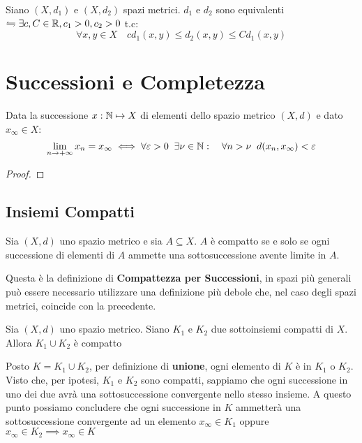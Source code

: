 Siano $(X,d_1)$ e $(X,d_2)$ spazi metrici. $d_1$ e $d_2$ sono equivalenti $\leftrightharpoons \exists c,C\in\mathbb{R}, c_1>0, c_2>0$ t.c:
$$ \forall x,y \in X\quad cd_1(x,y)\le d_2(x,y)\le Cd_1(x,y) $$


\section{Successioni e Completezza}
\begin{definition}
\end{definition}
\begin{definition}
\end{definition}
\begin{definition}
\end{definition}
\begin{proposition}
	\label{prop:succ_conv_lim}
	Data la successione $x: \mathbb{N} \mapsto X$ di elementi dello spazio metrico $(X,d)$ e dato $x_\infty\in X$:
	$$\lim\limits_{n\rightarrow+\infty}x_n=x_\infty\iff\forall\varepsilon > 0\;\;\exists\nu\in\mathbb{N}:\quad\forall n>\nu\;\;d(x_n,x_\infty)<\varepsilon$$
	\begin{proof}
	\end{proof}
\end{proposition}
\subsection{Insiemi Compatti}
\begin{definition}
	\label{def:compatto}
	Sia $(X,d)$ uno spazio metrico e sia $A \subseteq X$. $A$ è compatto se e solo se ogni successione di elementi di $A$ ammette una sottosuccessione avente limite in $A$.
	\begin{note}
		Questa è la definizione di \textbf{Compattezza per Successioni}, in spazi più generali può essere necessario utilizzare una definizione più debole che, nel caso degli spazi metrici, coincide con la precedente.
	\end{note}
\end{definition}
\begin{exercise}
	\label{ex:unione_compatti}
	Sia $(X,d)$ uno spazio metrico. Siano $K_1$ e $K_2$ due sottoinsiemi compatti di $X$. Allora $K_1 \cup K_2$ è compatto
	\begin{solution}
		Posto $K = K_1 \cup K_2$, per definizione di \textbf{unione}, ogni elemento di $K$ è in $K_1$ o $K_2$.
		Visto che, per ipotesi, $K_1$ e $K_2$ sono compatti, sappiamo che ogni successione in uno dei due avrà una sottosuccessione convergente nello stesso insieme. A questo punto possiamo concludere che ogni successione in $K$ ammetterà una sottosuccessione convergente ad un elemento $x_\infty \in K_1$ oppure $x_\infty \in K_2 \implies x_\infty \in K$
	\end{solution}
\end{exercise}

